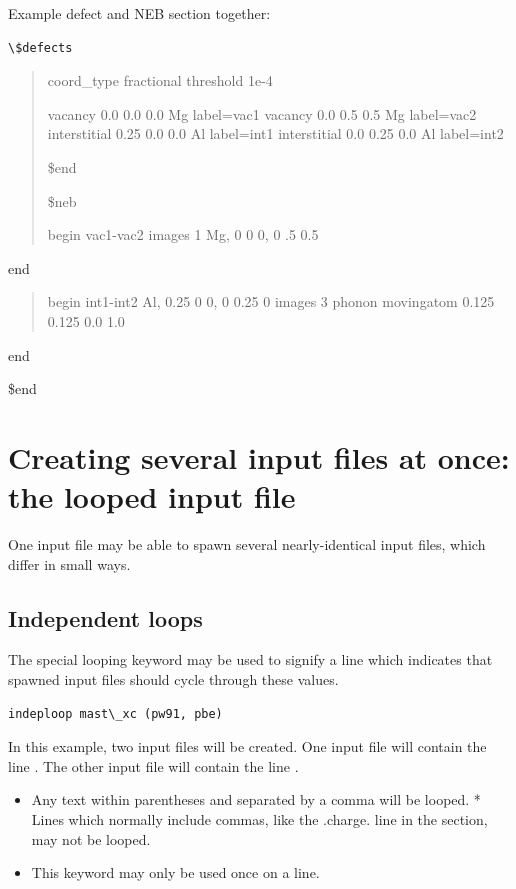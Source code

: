 \documentclass[letterpaper,10pt,english]{sphinxmanual}
\begin{document}
Example defect and NEB section together:

\begin{Verbatim}[commandchars=\\\{\}]
\$defects
\end{Verbatim}
\begin{quote}

coord\_type fractional
threshold 1e-4

vacancy 0.0 0.0 0.0 Mg label=vac1
vacancy 0.0 0.5 0.5 Mg label=vac2
interstitial 0.25 0.0 0.0 Al label=int1
interstitial 0.0 0.25 0.0 Al label=int2

\$end

\$neb

begin vac1-vac2
images 1
Mg, 0 0 0, 0 .5 0.5
\end{quote}

end
\begin{quote}

begin int1-int2
Al, 0.25 0 0, 0 0.25 0
images 3
phonon movingatom 0.125 0.125 0.0 1.0
\end{quote}

end

\$end


\section{Creating several input files at once: the looped input file}
\label{3_0_inputfile:creating-several-input-files-at-once-the-looped-input-file}
One input file may be able to spawn several nearly-identical input files, which differ in small ways.


\subsection{Independent loops}
\label{3_0_inputfile:independent-loops}
The special looping keyword  may be used to signify a line which indicates that spawned input files should cycle through these values.

\begin{Verbatim}[commandchars=\\\{\}]
indeploop mast\_xc (pw91, pbe)
\end{Verbatim}

In this example, two input files will be created. One input file will contain the line . The other input file will contain the line .
\begin{itemize}
\item {} 
Any text within parentheses and separated by a comma will be looped. *  Lines which normally include commas, like the .charge. line in the  section, may not be looped.

\item {} 
This keyword may only be used once on a line.

\end{itemize}
\end{document}
